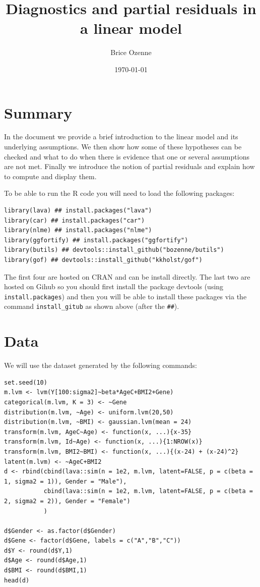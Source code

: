 \documentclass[12pt]{article}
\author{Brice Ozenne}
\date{\today}
\title{Diagnostics and partial residuals in a linear model}
\begin{document}
\maketitle

\section*{Summary}
\label{sec:org592f1c7}
In the document we provide a brief introduction to the linear model
and its underlying assumptions. We then show how some of these
hypotheses can be checked and what to do when there is evidence that
one or several assumptions are not met. Finally we introduce the
notion of partial residuals and explain how to compute and display
them.

\bigskip

To be able to run the R code you will need to load the following
packages:
\lstset{language=r,label= ,caption= ,captionpos=b,numbers=none}
\begin{lstlisting}
library(lava) ## install.packages("lava")
library(car) ## install.packages("car")
library(nlme) ## install.packages("nlme")
library(ggfortify) ## install.packages("ggfortify")
library(butils) ## devtools::install_github("bozenne/butils")
library(gof) ## devtools::install_github("kkholst/gof")
\end{lstlisting}

The first four are hosted on CRAN and can be install directly. The
last two are hosted on Gihub so you should first install the package
devtools (using \texttt{install.packages}) and then you will be able to
install these packages via the command \texttt{install\_gitub} as shown above
(after the \texttt{\#\#}).

\clearpage

\section{Data}
\label{sec:org2412e17}

We will use the dataset generated by the following commands:

\lstset{language=r,label= ,caption= ,captionpos=b,numbers=none}
\begin{lstlisting}
set.seed(10)
m.lvm <- lvm(Y[100:sigma2]~beta*AgeC+BMI2+Gene)
categorical(m.lvm, K = 3) <- ~Gene
distribution(m.lvm, ~Age) <- uniform.lvm(20,50)
distribution(m.lvm, ~BMI) <- gaussian.lvm(mean = 24)
transform(m.lvm, AgeC~Age) <- function(x, ...){x-35}
transform(m.lvm, Id~Age) <- function(x, ...){1:NROW(x)}
transform(m.lvm, BMI2~BMI) <- function(x, ...){(x-24) + (x-24)^2}
latent(m.lvm) <- ~AgeC+BMI2
d <- rbind(cbind(lava::sim(n = 1e2, m.lvm, latent=FALSE, p = c(beta = 1, sigma2 = 1)), Gender = "Male"),
		   cbind(lava::sim(n = 1e2, m.lvm, latent=FALSE, p = c(beta = 2, sigma2 = 2)), Gender = "Female")
		   )

d$Gender <- as.factor(d$Gender)
d$Gene <- factor(d$Gene, labels = c("A","B","C"))
d$Y <- round(d$Y,1)
d$Age <- round(d$Age,1)
d$BMI <- round(d$BMI,1)
head(d)
\end{lstlisting}
\end{document}
